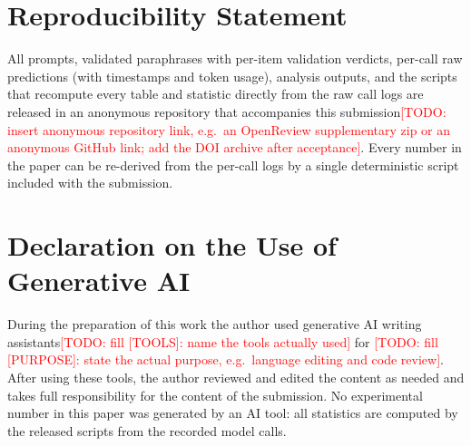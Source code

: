 \documentclass[10pt]{article}
\newcommand{\TODO}[1]{\textcolor{red}{[TODO: #1]}}
\begin{document}
\section*{Reproducibility Statement}
All prompts, validated paraphrases with per-item validation verdicts, per-call raw predictions (with timestamps and token usage), analysis outputs, and the scripts that recompute every table and statistic directly from the raw call logs are released in an anonymous repository that accompanies this submission\TODO{insert anonymous repository link, e.g.\ an OpenReview supplementary zip or an anonymous GitHub link; add the DOI archive after acceptance}. Every number in the paper can be re-derived from the per-call logs by a single deterministic script included with the submission.

\section*{Declaration on the Use of Generative AI}
During the preparation of this work the author used generative AI writing assistants\TODO{fill [TOOLS]: name the tools actually used} for \TODO{fill [PURPOSE]: state the actual purpose, e.g.\ language editing and code review}. After using these tools, the author reviewed and edited the content as needed and takes full responsibility for the content of the submission. No experimental number in this paper was generated by an AI tool: all statistics are computed by the released scripts from the recorded model calls.

\appendix
\renewcommand{\thetable}{\Alph{section}.\arabic{table}}
\renewcommand{\theHtable}{\Alph{section}.\arabic{table}}
\renewcommand{\theHfigure}{\Alph{section}.\arabic{figure}}



\end{document}
